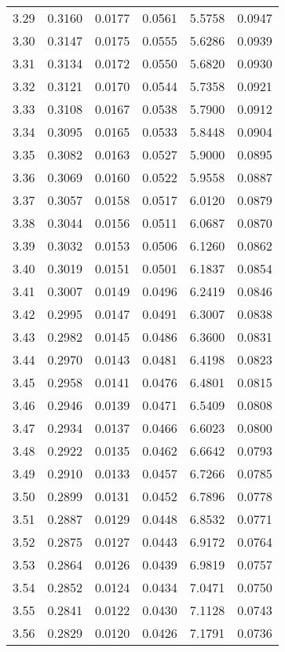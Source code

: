 \documentclass{article}
\begin{document}
\begin{longtable}{cccccc}
3.29 & 0.3160 & 0.0177 & 0.0561 & 5.5758 & 0.0947 \\
3.30 & 0.3147 & 0.0175 & 0.0555 & 5.6286 & 0.0939 \\
3.31 & 0.3134 & 0.0172 & 0.0550 & 5.6820 & 0.0930 \\
3.32 & 0.3121 & 0.0170 & 0.0544 & 5.7358 & 0.0921 \\
3.33 & 0.3108 & 0.0167 & 0.0538 & 5.7900 & 0.0912 \\
3.34 & 0.3095 & 0.0165 & 0.0533 & 5.8448 & 0.0904 \\
3.35 & 0.3082 & 0.0163 & 0.0527 & 5.9000 & 0.0895 \\
3.36 & 0.3069 & 0.0160 & 0.0522 & 5.9558 & 0.0887 \\
3.37 & 0.3057 & 0.0158 & 0.0517 & 6.0120 & 0.0879 \\
3.38 & 0.3044 & 0.0156 & 0.0511 & 6.0687 & 0.0870 \\
3.39 & 0.3032 & 0.0153 & 0.0506 & 6.1260 & 0.0862 \\
3.40 & 0.3019 & 0.0151 & 0.0501 & 6.1837 & 0.0854 \\
3.41 & 0.3007 & 0.0149 & 0.0496 & 6.2419 & 0.0846 \\
3.42 & 0.2995 & 0.0147 & 0.0491 & 6.3007 & 0.0838 \\
3.43 & 0.2982 & 0.0145 & 0.0486 & 6.3600 & 0.0831 \\
3.44 & 0.2970 & 0.0143 & 0.0481 & 6.4198 & 0.0823 \\
3.45 & 0.2958 & 0.0141 & 0.0476 & 6.4801 & 0.0815 \\
3.46 & 0.2946 & 0.0139 & 0.0471 & 6.5409 & 0.0808 \\
3.47 & 0.2934 & 0.0137 & 0.0466 & 6.6023 & 0.0800 \\
3.48 & 0.2922 & 0.0135 & 0.0462 & 6.6642 & 0.0793 \\
3.49 & 0.2910 & 0.0133 & 0.0457 & 6.7266 & 0.0785 \\
3.50 & 0.2899 & 0.0131 & 0.0452 & 6.7896 & 0.0778 \\
3.51 & 0.2887 & 0.0129 & 0.0448 & 6.8532 & 0.0771 \\
3.52 & 0.2875 & 0.0127 & 0.0443 & 6.9172 & 0.0764 \\
3.53 & 0.2864 & 0.0126 & 0.0439 & 6.9819 & 0.0757 \\
3.54 & 0.2852 & 0.0124 & 0.0434 & 7.0471 & 0.0750 \\
3.55 & 0.2841 & 0.0122 & 0.0430 & 7.1128 & 0.0743 \\
3.56 & 0.2829 & 0.0120 & 0.0426 & 7.1791 & 0.0736 \\

\end{longtable}
\end{document}
